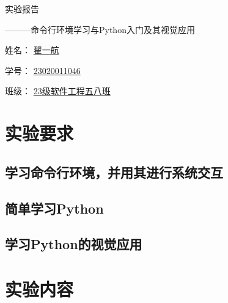 \documentclass[UTF8,a4paper]{ctexart}
\begin{document}
\begin{sloppypar}
	
	\begin{center}
		\begin{fontsize}{80pt}{20pt}
			实验报告
		\end{fontsize}

		\bigskip
		\bigskip
		
		\begin{fontsize}{35pt}{20pt}
			\begin{flushright}
				———命令行环境学习与{\Huge Python}入门及其视觉应用
			\end{flushright}
		\end{fontsize}
		
		\bigskip
		\bigskip
		\bigskip
		\bigskip
		\bigskip
		\bigskip
		\bigskip
		\bigskip
		\bigskip
		\bigskip
		\bigskip
		\bigskip
		\bigskip
		\bigskip
		\bigskip
		\bigskip
		\bigskip
		\bigskip
		\bigskip
		\bigskip
		\bigskip
		\bigskip
		
		\begin{fontsize}{25pt}{20pt}
			姓名：
			\underline{翟一航}
			
			\bigskip
			\bigskip
			\bigskip
			\bigskip
			
			学号：
			\underline{{\huge 23020011046}}
			
			\bigskip
			\bigskip
			\bigskip
			\bigskip
			
			班级：
			\underline{{\Huge 23}级软件工程五八班}
			
			
		\end{fontsize}
	\end{center}
	\section{实验要求}
	\subsection{学习命令行环境，并用其进行系统交互}
	\subsection{简单学习Python}
	\subsection{学习Python的视觉应用}
	\section{实验内容}

\end{sloppypar}
\end{document}
